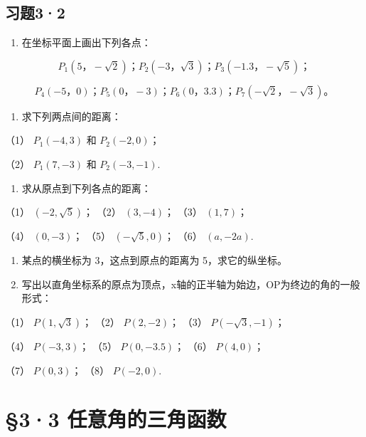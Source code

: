 \subsection{习题3·2}

\begin{enumerate}
\item
  在坐标平面上画出下列各点：
\end{enumerate}

\[
P _ {1} (5\text{，} - \sqrt {2})\text{；} P _ {2} (- 3\text{，} \sqrt {3})\text{；} P _ {3} (- 1.3\text{，} - \sqrt {5})\text{；}
\]

\[
P _ {4} (- 5\text{，} 0)\text{；} P _ {5} (0\text{，} - 3)\text{；} P _ {6} (0\text{，} 3.3)\text{；} P _ {7} (- \sqrt {2}\text{，} - \sqrt {3})\text{。}
\]

\begin{enumerate}[start=2]
\item
  求下列两点间的距离：
\end{enumerate}

（1） \(P_{1}(-4,3)\) 和 \(P_{2}(-2,0)\)；

（2） \(P_{1}(7, -3)\) 和 \(P_{2}(-3, -1)\).

\begin{enumerate}[start=3]
\item
  求从原点到下列各点的距离：
\end{enumerate}

（1） \((-2, \sqrt{5})\)； （2） \((3, -4)\)； （3） \((1, 7)\)；

（4） \((0, -3)\)； （5） \((- \sqrt{5}, 0)\)； （6） \((a, -2a)\).

\begin{enumerate}[start=4]
\item
  某点的横坐标为 3，这点到原点的距离为 5，求它的纵坐标。
\item
  写出以直角坐标系的原点为顶点，x轴的正半轴为始边，OP为终边的角的一般形式：
\end{enumerate}

（1） \(P(1, \sqrt{3})\)； （2） \(P(2, -2)\)； （3）
\(P(-\sqrt{3}, -1)\)；

（4） \(P(-3, 3)\)； （5） \(P(0, -3.5)\)； （6） \(P(4, 0)\)；

（7） \(P(0,3)\)； （8） \(P(-2,0)\).

\section{§3·3 任意角的三角函数}

